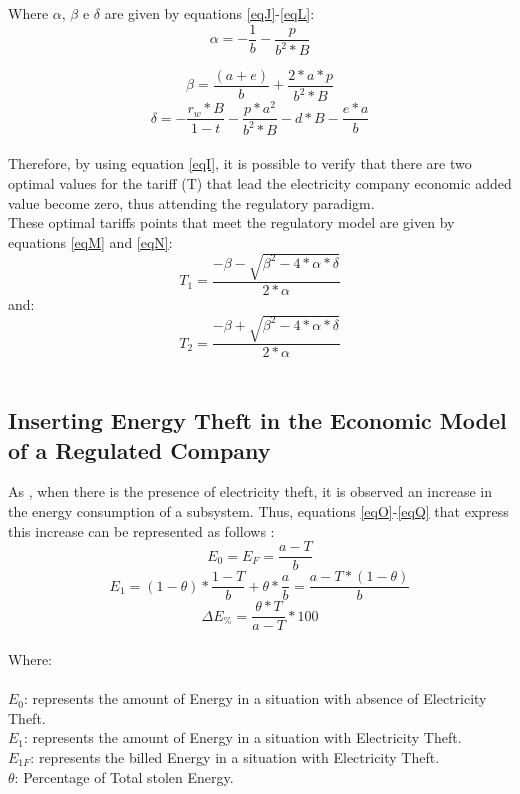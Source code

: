 \documentclass[10pt, letterpaper]{elsarticle}
\begin{document}
Where $ \alpha$, $\beta$ e $\delta $ are given by equations \ref{eqJ}-\ref{eqL}:\\
\begin{equation}
\alpha = -\frac{1}{b} - \frac{p}{b^2*B}
\label{eqJ}
\end{equation}

\begin{equation}
\beta = \frac{(a+e)}{b} + \frac{2*a*p}{b^2*B}
\label{eqK}
\end{equation}
\begin{equation}
\delta = -\frac{r_w *B}{1-t}- \frac{p*a^2}{b^2*B}-d*B- \frac{e*a}{b}
\label{eqL}
\end{equation}\\
Therefore, by using equation \ref{eqI}, it is possible to verify that there are two optimal values for the tariff (T) that lead the electricity company economic added value become zero, thus attending the regulatory paradigm. \\
These optimal tariffs points that meet the regulatory model are given by equations \ref{eqM} and \ref{eqN}:\\
\begin{equation}
T_1 = \frac{-\beta - \sqrt{\beta ^2 - 4* \alpha *\delta}}{2*\alpha}
\label{eqM}
\end{equation}
and:
\begin{equation}
T_2 = \frac{-\beta + \sqrt{\beta ^2 - 4* \alpha *\delta}}{2*\alpha}
\label{eqN}
\end{equation}\\

\subsection{Inserting Energy Theft in the Economic Model of a Regulated Company}
\label{SS:2-3}

As \citet{Arango2016ImpactQuality}, when there is the presence of electricity theft, it is observed an increase in the energy consumption of a subsystem. Thus, equations \ref{eqO}-\ref{eqQ} that express this increase can be represented as follows :\\
\begin{equation}
E_0 = E_F = \frac{a-T}{b}
\label{eqO}
\end{equation}
\begin{equation}
E_1 = (1-\theta)* \frac{1-T}{b}+\theta* \frac{a}{b} = \frac{a - T*(1-\theta)}{b}
\label{eqP}
\end{equation}
\begin{equation}
\Delta E_\% = \frac{\theta*T}{a-T} * 100
\label{eqQ}
\end{equation}\\
Where:\\\\
$E_0$: represents the amount of Energy in a situation with absence of Electricity Theft.\\
$E_1$: represents the amount of Energy in a situation with Electricity Theft.\\
$E_{1F}$: represents the billed Energy in a situation with Electricity Theft.\\
$\theta$: Percentage of Total stolen Energy.\\
\end{document}
